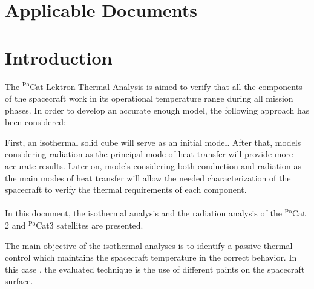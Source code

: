 \section*{Applicable Documents}

\begin{table}[H]
    \centering
\end{table}

\newpage

\section{Introduction}
The $^{\text{Po}}$Cat-Lektron Thermal Analysis is aimed to verify that all the components of the spacecraft
work in its operational temperature range during all mission phases. In order to develop
an accurate enough model, the following approach has been considered:

First, an isothermal solid cube will serve as an initial model. After that, models considering
radiation as the principal mode of heat transfer will provide more accurate results. Later
on, models considering both conduction and radiation as the main modes of heat transfer
will allow the needed characterization of the spacecraft to verify the thermal requirements
of each component.
\paragraph{}
In this document, the isothermal analysis and the radiation analysis of the $^{\text{Po}}$Cat
2 and $^{\text{Po}}$Cat3 satellites are presented.

The main objective of the isothermal analyses is to identify a passive thermal control
which maintains the spacecraft temperature in the correct behavior. In this case
, the evaluated technique is the use of different paints on the spacecraft surface.
